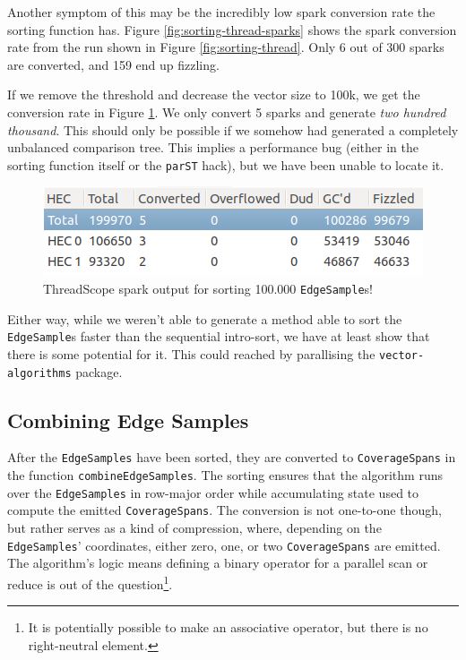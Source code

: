 \documentclass[12pt, a4paper]{article}
\begin{document}
Another symptom of this may be the incredibly low spark conversion rate the sorting function has.
Figure \ref{fig:sorting-thread-sparks} shows the spark conversion rate from the run shown in
Figure \ref{fig:sorting-thread}. Only 6 out of 300 sparks are converted, and 159 end up fizzling.


If we remove the threshold and decrease the vector size to 100k, we get the conversion rate in
Figure \ref{fig:sorting-thread-100k-sparks}. We only convert 5 sparks and generate \textit{two hundred thousand}. This should only be possible if we somehow had generated
a completely unbalanced comparison tree. This implies a performance bug (either in the sorting function
 itself or the \texttt{parST} hack), but we have been unable to locate it.
 \begin{figure}[h!]
  \centering
  \includegraphics[width=0.6\linewidth]{../threadscope/sorting/sorting-100k-sparks}
  \caption{ThreadScope spark output for sorting 100.000 \texttt{EdgeSample}s!}
  \label{fig:sorting-thread-100k-sparks}
\end{figure}

Either way, while we weren't able to generate a method able to sort the \texttt{EdgeSample}s faster
than the sequential intro-sort, we have at least show that there is some potential for it. This
 could reached by parallising the \texttt{vector-algorithms} package.
 
\subsection{Combining Edge Samples}

After the \texttt{EdgeSamples} have been sorted, they are converted to \texttt{CoverageSpans} in the function \texttt{combineEdgeSamples}. The sorting ensures that the algorithm runs over the \texttt{EdgeSamples} in row-major order while accumulating state used to compute the emitted \texttt{CoverageSpans}. The conversion is not one-to-one though, but rather serves as a kind of compression, where, depending on the \texttt{EdgeSamples}' coordinates, either zero, one, or two \texttt{CoverageSpans} are emitted. The algorithm's logic means defining a binary operator for a parallel scan or reduce is out of the question\footnote{It is potentially possible to make an associative operator, but there is no right-neutral element.}.
\end{document}
